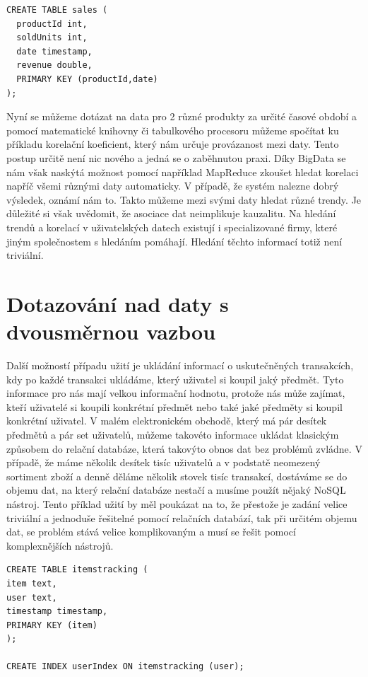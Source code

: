 \begin{lstlisting}[caption={Tabulka zisků z prodeje předmětů v daný den},label=corr1]
CREATE TABLE sales ( 
  productId int,
  soldUnits int,
  date timestamp,
  revenue double, 
  PRIMARY KEY (productId,date) 
);
\end{lstlisting}

Nyní se můžeme dotázat na data pro 2 různé produkty za určité časové období a pomocí matematické knihovny či tabulkového procesoru můžeme spočítat ku příkladu korelační koeficient, který nám určuje provázanost mezi daty. Tento postup určitě není nic nového a jedná se o zaběhnutou praxi. Díky BigData se nám však naskýtá možnost pomocí například MapReduce zkoušet hledat korelaci napříč všemi různými daty automaticky. V případě, že systém nalezne dobrý výsledek, oznámí nám to. Takto můžeme mezi svými daty hledat různé trendy. Je důležité si však uvědomit, že asociace dat neimplikuje kauzalitu. Na hledání trendů a korelací v uživatelských datech existují i  specializované firmy, které jiným společnostem s hledáním pomáhají. Hledání těchto informací totiž není triviální.

\section{Dotazování nad daty s dvousměrnou vazbou}
Další možností případu užití je ukládání informací o uskutečněných transakcích, kdy po každé transakci ukládáme, který uživatel si koupil jaký předmět. Tyto informace pro nás mají velkou informační hodnotu, protože nás může zajímat, kteří uživatelé si koupili konkrétní předmět nebo také jaké předměty si koupil konkrétní uživatel. V malém elektronickém obchodě, který má pár desítek předmětů a pár set uživatelů, můžeme takovéto informace ukládat klasickým způsobem do relační databáze, která takovýto obnos dat bez problémů zvládne. V případě, že máme několik desítek tisíc uživatelů a v podstatě neomezený sortiment zboží a denně děláme několik stovek tisíc transakcí, dostáváme se do objemu dat, na který relační databáze nestačí a musíme použít nějaký NoSQL nástroj. Tento příklad užití by měl poukázat na to, že přestože je zadání velice triviální a jednoduše řešitelné pomocí relačních databází, tak při určitém objemu dat, se problém stává velice komplikovaným a musí se řešit pomocí komplexnějších nástrojů.

\begin{lstlisting}[caption={Vytvoření tabulky s dvousměrnou vazbou pomocí indexu},label=CQL10]
CREATE TABLE itemstracking ( 
item text,
user text,
timestamp timestamp,
PRIMARY KEY (item)
);

CREATE INDEX userIndex ON itemstracking (user);
\end{lstlisting}

